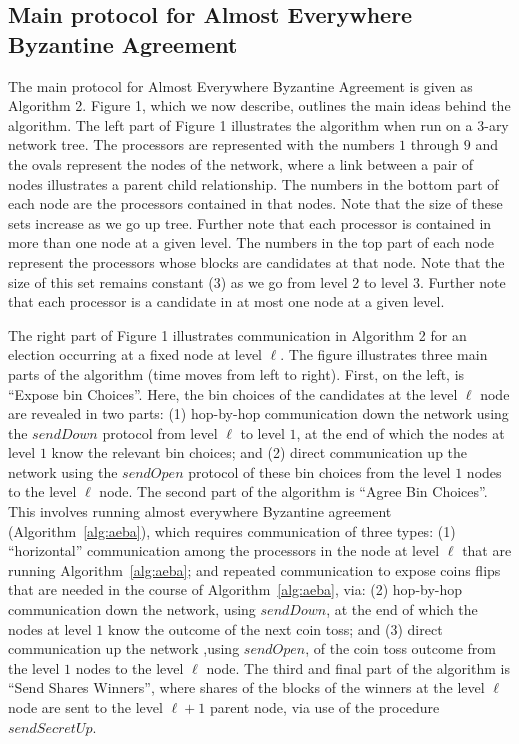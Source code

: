 \documentclass{sig-alternate}
\begin{document}
\subsection{Main protocol for Almost Everywhere Byzantine Agreement}\label{main}

The main protocol for Almost Everywhere Byzantine Agreement is given as Algorithm 2.  Figure 1, which we now describe, outlines the main ideas behind the algorithm.  The left part of Figure 1 illustrates the algorithm when run on a 3-ary network tree.  The processors are represented with the numbers $1$ through $9$ and the ovals represent the nodes of the network, where a link between a pair of nodes illustrates a parent child relationship.  The numbers in the bottom part of each node are the processors contained in that nodes.  Note that the size of these sets increase as we go up tree.  Further note that each processor is contained in more than one node at a given level.  The numbers in the top part of each node represent the processors whose blocks are candidates at that node.  Note that the size of this set remains constant ($3$) as we go from level 2 to level 3.  Further note that each processor is a candidate in at most one node at a given level.

The right part of Figure 1 illustrates communication in Algorithm 2 for an election occurring at a fixed node at level $\ell$.  The figure illustrates three main parts of the algorithm (time moves from left to right).  First, on the left, is ``Expose bin Choices''.  Here, the bin choices of the candidates at the level $\ell$ node are revealed in two parts: (1) hop-by-hop communication down the network using the $sendDown$ protocol from level $\ell$ to level $1$, at the end of which the nodes at level $1$ know the relevant bin choices; and (2) direct communication up the network using the  $sendOpen$ protocol of these bin choices from the level $1$ nodes to the level $\ell$ node.  The second part of the algorithm is ``Agree Bin Choices''.  This involves running almost everywhere Byzantine agreement (Algorithm~\ref{alg:aeba}), which requires communication of three types: (1) ``horizontal'' communication among the processors in the node at level $\ell$ that are running Algorithm~\ref{alg:aeba}; and repeated communication to expose coins flips that are needed in the course of Algorithm~\ref{alg:aeba}, via: (2) hop-by-hop communication down the network, using $sendDown$, at the end of which the nodes at level $1$ know the outcome of the next coin toss; and (3) direct communication up the network ,using $sendOpen$, of the coin toss outcome from the level $1$ nodes to the level $\ell$ node.  The third and final part of the algorithm is ``Send Shares Winners'',  where shares of the blocks of the winners at the level $\ell$ node are sent to the level $\ell+1$ parent node, via use of the procedure $sendSecretUp$.
\end{document}
